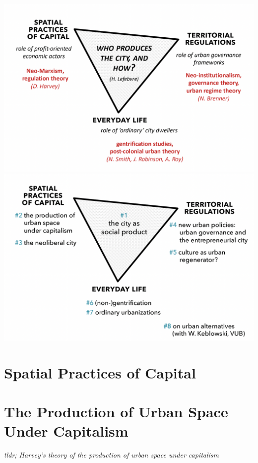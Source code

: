 \documentclass{article}
\begin{document}
\includegraphics[width=\textwidth]{map_course_organisation1}
\includegraphics[width=\textwidth]{map_course_organisation2}


\section{Spatial Practices of Capital}

\section{The Production of Urban Space Under Capitalism}
\date{October 7th, 2021}

\textit{tldr; Harvey's theory of the production of urban space under capitalism}
\end{document}
